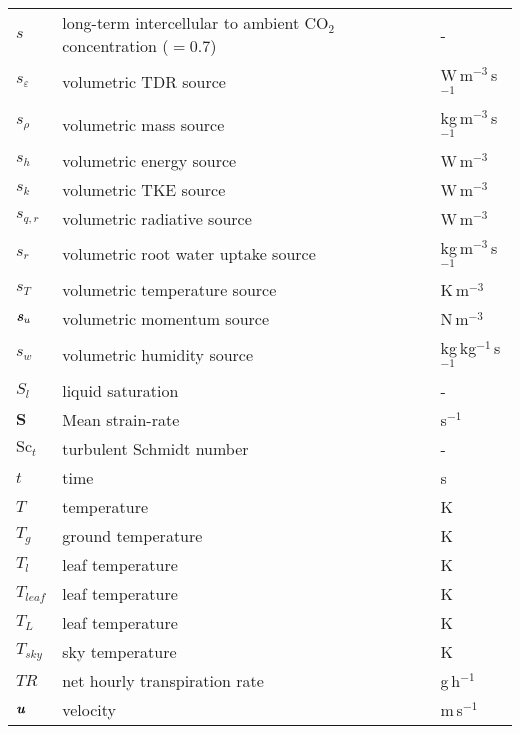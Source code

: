 \begin{longtable}{p{}p{}p{}}
	$s$ & long-term intercellular to ambient CO$_2$ concentration ($=0.7$) & - \\ 
	$s_{\varepsilon}$ & volumetric TDR source & W\,m$^{-3}$\,s$^{-1}$ \\ 		
	$s_{\rho}$ & volumetric mass source & kg\,m$^{-3}$\,s$^{-1}$ \\ 
	$s_h$ & volumetric energy source & W\,m$^{-3}$ \\ 		
	$s_k$ & volumetric TKE source & W\,m$^{-3}$ \\ 		
	$s_{q,r}$ & volumetric radiative source & W\,m$^{-3}$ \\ 		
	$s_r$ & volumetric root water uptake source & kg\,m$^{-3}$\,s$^{-1}$ \\ 	
	$s_T$ & volumetric temperature source & K\,m$^{-3}$ \\ 		
	$\textbf{\textit{s}}_u$ & volumetric momentum source & N\,m$^{-3}$ \\ 	
	$s_w$ & volumetric humidity source & kg\,kg$^{-1}$\,s$^{-1}$ \\ 		
	$S_l$ & liquid saturation & - \\ 
	$\textbf{S}$ & Mean strain-rate &  s$^{-1}$\\ 				
	${\textrm{Sc}_t}$ & turbulent Schmidt number & - \\ 				
	$t$ & time & s \\ 
	$T$ & temperature & K  \\ 
	$T_{\textit{g}}$ & ground temperature & K  \\ 	
	$T_{l}$ & leaf temperature & K  \\ 	
	$T_{leaf}$ & leaf temperature & K  \\ 	
	$T_{L}$ & leaf temperature & K  \\ 	
	$T_{\textit{sky}}$ & sky temperature & K  \\ 		
	$\textit{TR}$ & net hourly transpiration rate & g\,h$^{-1}$  \\ 	
	$\textbf{\textit{u}}$ & velocity & m\,s$^{-1}$ \\ 

\end{longtable}
